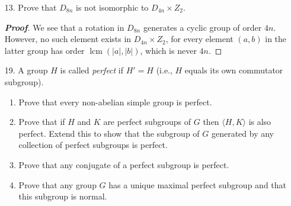 \documentclass[12pt,leqno]{book}
\theoremstyle{definition}
\newcommand{\lcm}{\operatorname{lcm}}
\newenvironment{Proof}{\begin{proof}[\textnormal{\textbf{Proof}}]}{\end{proof}}
\begin{document}
\begin{enumerate}
\begin{Proof}
Take $g,x^p\in P$. Then \begin{align*}[g,x^p]&=g^{-1}x^{-p}gx^p\\&=(g^{-1}x^{-1}g)^px^p\\&=g^{-p}x^{-p}g^px^p\\&=1\end{align*} Thus, the map $x\mapsto x^p$ maps into $Z(P)$. 

Now, since $|K|=\frac{|P|}{|Z(P)|}$, and since $Z(P)$ is not of order $p^2$, we see that $|K|$ is $p^3$, $p^2$ or $\{1\}$. However, if $K=\{1\}$, the map is injective and so $G$ is cyclic. Therefore, if $G$ is not cyclic, $|K|=p^3$ or $p^2$. 

Finally, we see that the squaring map is not a homomorphism for a non-abelian group of order 8: simply take $ij\in Q_8$ and $rs\in D_8$. We see that $(ij)^2=-1$ yet $i^2j^2=1$. Similarly, $(rs)^2=1$ yet $r^2s^2=r^2$. In the argument given above, the fact that $p$ divides $\frac{p(p-1)}{2}$ only holds if $p$ is odd. 
\end{Proof}

 \item [13.] Prove that $D_{8n}$ is not isomorphic to $D_{4n}\times Z_2$. 

\begin{Proof}
 We see that a rotation in $D_{8n}$ generates a cyclic group of order $4n$. However, no such element exists in $D_{4n}\times Z_2$, for every element $(a,b)$ in the latter group has order $\lcm(|a|,|b|)$, which is never $4n$.
\end{Proof}

 \item [19.] A group $H$ is called \textit{perfect} if $H'=H$ (i.e., $H$ equals its own commutator subgroup).
  \begin{enumerate}
   \item Prove that every non-abelian simple group is perfect.
   \item Prove that if $H$ and $K$ are perfect subgroups of $G$ then $\langle H,K\rangle$ is also perfect. Extend this to show that the subgroup of $G$ generated by any collection of perfect subgroups is perfect.
   \item Prove that any conjugate of a perfect subgroup is perfect.
   \item Prove that any group $G$ has a unique maximal perfect subgroup and that this subgroup is normal.
  \end{enumerate}


\end{enumerate}
\end{document}
